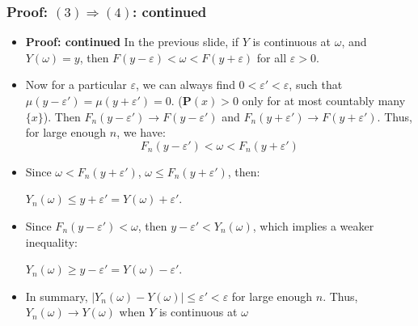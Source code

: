 \documentclass[handout]{beamer}
\newcommand{\BP}{\mathbf{P}}
\begin{document}
\frame
{
  \frametitle{Proof: $(3) \Rightarrow (4)$: continued} 

   \begin{itemize}
          
                     
                     \item<1-> \textbf{Proof: continued}  In the previous slide, if $Y$ is continuous at $\omega$, and $Y(\omega)=y$, then $F(y-\varepsilon)<\omega< F(y+\varepsilon) $ for all $\varepsilon>0$. 
                     
                     \item<2-> Now for a particular $\varepsilon$, we can always find $0<\varepsilon'<\varepsilon$, such that $\mu(y-\varepsilon')=\mu(y+\varepsilon')=0$. ($\BP(x)>0$ only for at most countably many $\{x\}$). Then $F_n(y-\varepsilon')\rightarrow F(y-\varepsilon')$ and $F_n(y+\varepsilon')\rightarrow F(y+\varepsilon')$. Thus, for large enough $n$, we have:  
                     $$F_n(y-\varepsilon')<\omega< F_n(y+\varepsilon') $$                  
                     
                     \item<3->[-] Since $\omega< F_n(y+\varepsilon')$, $\omega \le F_n(y+\varepsilon')$, then: 
                     
       \hspace{3cm}             $Y_n(\omega)\leq  y+\varepsilon'=Y(\omega)+\varepsilon'$. 
       
       \vspace{5mm}
                     \item<4->[-] Since $F_n(y-\varepsilon')<\omega$, then $ y-\varepsilon' < Y_n(\omega) $, which implies a weaker inequality: 
                     
       \hspace{3cm}             $Y_n(\omega)\geq y-\varepsilon'=Y(\omega)-\varepsilon'$. 
                            \vspace{5mm}

                         \item<5->[-] In summary, $|Y_n(\omega)-Y(\omega)|\leq \varepsilon'<\varepsilon$ for large enough $n$. Thus, $Y_n(\omega)\rightarrow Y(\omega)$ when $Y$ is continuous at $\omega$
                                                                  
                                               \end{itemize}
}
\end{document}
